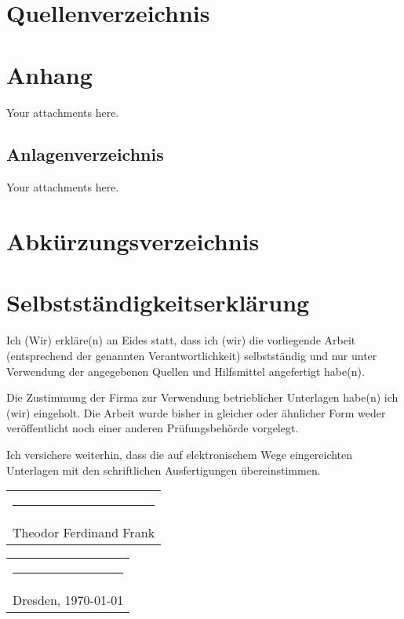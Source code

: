 \documentclass[12pt,a4paper]{article}
\begin{document}
\newpage
\section{Quellenverzeichnis}


\printbibliography
\newpage

\section{Anhang}
Your attachments here.

\subsection{Anlagenverzeichnis}
Your attachments here.

\section{Abkürzungsverzeichnis} \label{Abkürzungsverzeichnis}

\begin{acronym}
\end{acronym}



\newpage
\thispagestyle{empty}
\section*{Selbstständigkeitserklärung}

Ich (Wir) erkläre(n) an Eides statt, dass ich (wir) die vorliegende Arbeit (entsprechend der genannten Verantwortlichkeit) selbstständig und nur unter Verwendung der angegebenen Quellen und Hilfsmittel angefertigt habe(n). 
\medskip

Die Zustimmung der Firma zur Verwendung betrieblicher Unterlagen habe(n) ich (wir) eingeholt. Die Arbeit wurde bisher in gleicher oder ähnlicher Form weder veröffentlicht noch einer anderen Prüfungsbehörde vorgelegt.
\medskip

Ich versichere weiterhin, dass die auf elektronischem Wege eingereichten Unterlagen mit den schriftlichen Ausfertigungen übereinstimmen.

\vspace{15mm}
\hfill%
\begin{tabular}[t]{c}
	\rule{10em}{0.4pt} \\ Theodor Ferdinand Frank
\end{tabular}%
\hfill%
\begin{tabular}[t]{c}
	\rule{10em}{0.4pt} \\ Dresden, \today
\end{tabular}%
\hfill\strut
\end{document}
